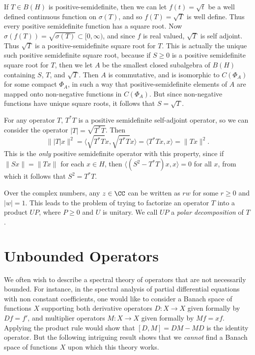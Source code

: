 If $T \in B(H)$ is positive-semidefinite, then we can let $f(t) = \sqrt{t}$ be a well defined continuous function on $\sigma(T)$, and so $f(T) = \sqrt{T}$ is well define. Thus every positive semidefinite function has a square root. Now $\sigma(f(T)) = \sqrt{\sigma(T)} \subset [0,\infty)$, and since $f$ is real valued, $\sqrt{T}$ is self adjoint. Thus $\sqrt{T}$ is a positive-semidefinite square root for $T$. This is actually the unique such positive semidefinite square root, because if $S \geq 0$ is a positive semidefinite square root for $T$, then we let $A$ be the smallest closed subalgebra of $B(H)$ containing $S$, $T$, and $\sqrt{T}$. Then $A$ is commutative, and is isomorphic to $C(\Phi_A)$ for some compact $\Phi_A$, in such a way that positive-semidefinite elements of $A$ are mapped onto non-negative functions in $C(\Phi_A)$. But since non-negative functions have unique square roots, it follows that $S = \sqrt{T}$.

For any operator $T$, $T^*T$ is a positive semidefinite self-adjoint operator, so we can consider the operator $|T| = \sqrt{T^*T}$. Then
%
\[ \| |T| x \|^2 = \langle \sqrt{T^* T} x, \sqrt{T^* T} x \rangle = \langle T^*T x, x \rangle = \| Tx \|^2. \]
%
This is the \emph{only} positive semidefinite operator with this property, since if $\| Sx \| = \| Tx \|$ for each $x \in H$, then $\langle (S^2 - T^* T) x, x \rangle = 0$ for all $x$, from which it follows that $S^2 = T^*T$.

Over the complex numbers, any $z \in \CC$ can be written as $r w$ for some $r \geq 0$ and $|w| = 1$. This leads to the problem of trying to factorize an operator $T$ into a product $U P$, where $P \geq 0$ and $U$ is unitary. We call $UP$ a \emph{polar decomposition} of $T$.




















\chapter{Unbounded Operators}

We often wish to describe a spectral theory of operators that are not necessarily bounded. For instance, in the spectral analysis of partial differential equations with non constant coefficients, one would like to consider a Banach space of functions $X$ supporting both derivative operators $D: X \to X$ given formally by $Df = f'$, and multiplier operators $M: X \to X$ given formally by $Mf = xf$. Applying the product rule would show that $[D,M] = DM - MD$ is the identity operator. But the following intriguing result shows that we \emph{cannot} find a Banach space of functions $X$ upon which this theory works.

